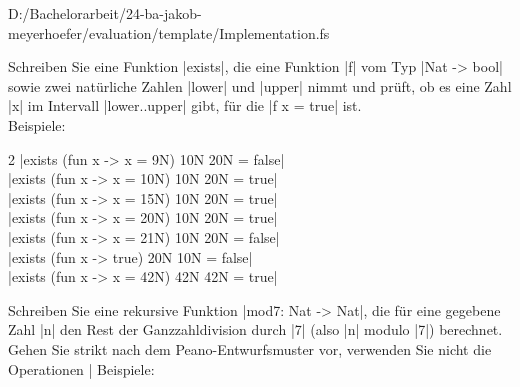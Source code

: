 \begin{tasks}
\begin{tasks}
{{			}{D:/Bachelorarbeit/24-ba-jakob-meyerhoefer/evaluation/template/Implementation.fs}
		}
\end{tasks}
\pagebreak\item Schreiben Sie eine Funktion \fsharp|exists|, die eine Funktion \fsharp|f| vom Typ \fsharp|Nat -> bool| sowie zwei natürliche Zahlen
	\fsharp|lower| und \fsharp|upper| nimmt und prüft, ob es eine Zahl \fsharp|x| im Intervall \fsharp|lower..upper| gibt, für die \fsharp|f x = true| ist.\\[5pt]
	Beispiele:\vspace{-.5\baselineskip}
	\begin{multicols}{2}
		\noindent			
		\fsharp|exists (fun x -> x = 9N) 10N 20N = false|\\
		\fsharp|exists (fun x -> x = 10N) 10N 20N = true|\\
		\fsharp|exists (fun x -> x = 15N) 10N 20N = true|\\
		\fsharp|exists (fun x -> x = 20N) 10N 20N = true|\\
		\fsharp|exists (fun x -> x = 21N) 10N 20N = false|\\
		\fsharp|exists (fun x -> true) 20N 10N = false|\\
		\fsharp|exists (fun x -> x = 42N) 42N 42N = true|
	\end{multicols}
\item Schreiben Sie eine rekursive Funktion \fsharp|mod7: Nat -> Nat|, die für eine gegebene Zahl \fsharp|n| den Rest der Ganzzahldivision durch \fsharp|7| (also \fsharp|n| modulo \fsharp|7|) berechnet.
Gehen Sie strikt nach dem Peano-Entwurfsmuster vor, verwenden Sie nicht die Operationen \fsharp|%
	Beispiele:\vspace{-.5\baselineskip}

\end{tasks}
